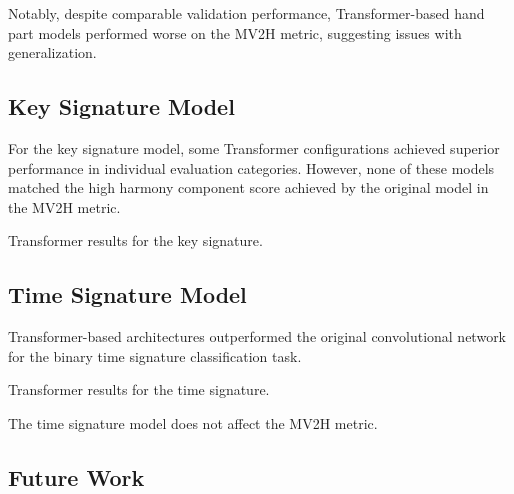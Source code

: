 Notably, despite comparable validation performance, Transformer-based hand part models performed worse on the MV2H metric, suggesting issues with generalization.

\subsection{Key Signature Model}

For the key signature model, some Transformer configurations achieved superior performance in individual evaluation categories. However, none of these models matched the high harmony component score achieved by the original model in the MV2H metric.

\begin{table}[ht!]
\centering

\caption[Transformer results for the key signature.]{Transformer results for the key signature.}
\label{key_signature_transformer}
\end{table}

\subsection{Time Signature Model}

Transformer-based architectures outperformed the original convolutional network for the binary time signature classification task.

\begin{table}[ht!]
\centering

\caption[Transformer results for the time signature.]{Transformer results for the time signature.}
\label{time_signature_transformer}
\end{table}

The time signature model does not affect the MV2H metric.

\subsection{Future Work}

